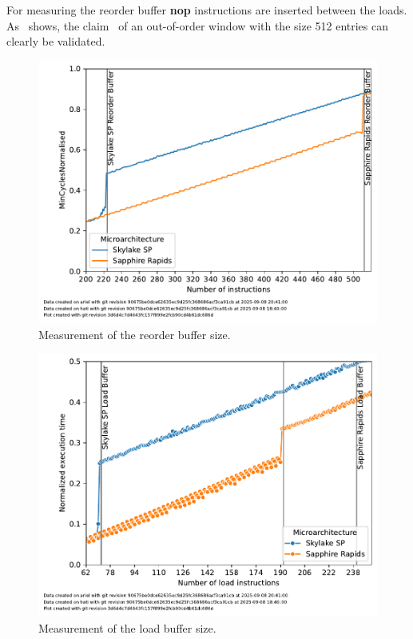 For measuring the reorder buffer \textbf{nop} instructions are inserted between the loads.
As~ shows, the claim~\cite{ServerTheHome_2023_SPR_Press,Wccftech_2023_SPR_Press} of an out-of-order window with the size \SI{512}{} entries can clearly be validated.

\begin{figure}[]
    \centering
    \includegraphics[width=0.8\columnwidth]{fig/robsize/reorder-buffer.pdf}
    \caption{\label{fig:robsize-reorder}Measurement of the reorder buffer size.}
\end{figure}
\begin{figure}[]
    \centering
    \includegraphics[width=0.8\columnwidth]{fig/robsize/load-buffer.pdf}
    \caption{\label{fig:robsize-load}Measurement of the load buffer size.}
\end{figure}

